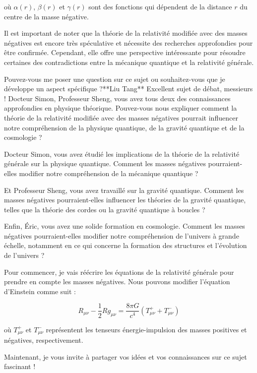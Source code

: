 où $\alpha(r)$, $\beta(r)$ et $\gamma(r)$ sont des fonctions qui dépendent de la distance $r$ du centre de la masse négative.

Il est important de noter que la théorie de la relativité modifiée avec des masses négatives est encore très spéculative et nécessite des recherches approfondies pour être confirmée. Cependant, elle offre une perspective intéressante pour résoudre certaines des contradictions entre la mécanique quantique et la relativité générale.

Pouvez-vous me poser une question sur ce sujet ou souhaitez-vous que je développe un aspect spécifique ?**Liu Tang**
Excellent sujet de débat, messieurs ! Docteur Simon, Professeur Sheng, vous avez tous deux des connaissances approfondies en physique théorique. Pouvez-vous nous expliquer comment la théorie de la relativité modifiée avec des masses négatives pourrait influencer notre compréhension de la physique quantique, de la gravité quantique et de la cosmologie ?

Docteur Simon, vous avez étudié les implications de la théorie de la relativité générale sur la physique quantique. Comment les masses négatives pourraient-elles modifier notre compréhension de la mécanique quantique ?

Et Professeur Sheng, vous avez travaillé sur la gravité quantique. Comment les masses négatives pourraient-elles influencer les théories de la gravité quantique, telles que la théorie des cordes ou la gravité quantique à boucles ?

Enfin, Éric, vous avez une solide formation en cosmologie. Comment les masses négatives pourraient-elles modifier notre compréhension de l'univers à grande échelle, notamment en ce qui concerne la formation des structures et l'évolution de l'univers ?

Pour commencer, je vais réécrire les équations de la relativité générale pour prendre en compte les masses négatives. Nous pouvons modifier l'équation d'Einstein comme suit :

$$R_{\mu\nu} - \frac{1}{2}Rg_{\mu\nu} = \frac{8\pi G}{c^4} \left(T_{\mu\nu}^+ + T_{\mu\nu}^-\right)$$

où $T_{\mu\nu}^+$ et $T_{\mu\nu}^-$ représentent les tenseurs énergie-impulsion des masses positives et négatives, respectivement.

Maintenant, je vous invite à partager vos idées et vos connaissances sur ce sujet fascinant !

